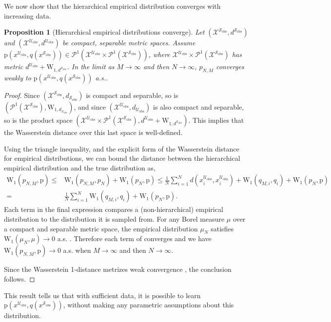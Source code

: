 \documentclass[12pt]{article}
\newtheorem{proposition}{Proposition}
\newcommand{\Sc}{\mathcal{S}}
\newcommand{\Uc}{\mathcal{U}}
\newcommand{\pr}{\mathrm{p}}
\newcommand{\obs}{\mathrm{obs}}
\newcommand{\Was}{\mathrm{W}}
\begin{document}
We now show that the hierarchical empirical distribution converges with increasing data.
\begin{proposition}[Hierarchical empirical distributions converge]
	Let $(\mathcal{X}^{\Sc_\obs}, d^{\Sc_\obs})$ and $(\mathcal{X}^{\Uc_\obs}, d^{\Uc_\obs})$ be compact, separable metric spaces.
	Assume $\pr(x^{\Uc_\obs}, q(x^{\Sc_\obs})) \in \mathcal{P}^1(\mathcal{X}^{\Uc_\obs} \times \mathcal{P}^1(\mathcal{X}^{\Sc_\obs}))$, where $\mathcal{X}^{\Uc_\obs} \times \mathcal{P}^1(\mathcal{X}^{\Sc_\obs})$ has metric $d^{\Uc_\obs} + \Was_{1,d^{\Sc_\obs}}$.
	In the limit as $M \to \infty $ and then $N \to \infty$,  $p_{N,M}$ converges weakly to $\pr(x^{\Uc_\obs}, q(x^{\Sc_\obs}))$ a.s..
\end{proposition}
\begin{proof}
	Since $(\mathcal{X}^{\Sc_\obs}, d_{\Sc_\obs})$ is compact and separable, so is $(\mathcal{P}^1(\mathcal{X}^{\Sc_\obs}), \Was_{1, d_{\Sc_\obs}})$, and since $(\mathcal{X}^{\Uc_\obs}, d_{\Uc_\obs})$ is also compact and separable, so is the product space $(\mathcal{X}^{\Uc_\obs} \times \mathcal{P}^1(\mathcal{X}^{\Sc_\obs}), d^{\Uc_\obs} + \Was_{1,d^{\Sc_\obs}})$.
	This implies that the Wasserstein distance over this last space is well-defined.
	
	Using the triangle inequality, and the explicit form of the Wasserstein distance for empirical distributions, we can bound the distance between the hierarchical empirical distribution and the true distribution as,
	\begin{equation} \label{eqn:wass_decomp}
	\begin{split}
		\Was_1(p_{N,M}, \pr) \le & \Was_1(p_{N,M}, p_N) + \Was_1(p_N, \pr) 
		\le \frac{1}{N} \sum_{i=1}^N d(x^{\Uc_\obs}_i, x^{\Uc_\obs}_i) + \Was_1(q_{M,i}, q_i) + \Was_1(p_N,\pr)\\ = & \frac{1}{N} \sum_{i=1}^N \Was_1(q_{M,i}, q_i) + \Was_1(p_N,\pr).
	\end{split}
	\end{equation}
	Each term in the final expression compares a (non-hierarchical) empirical distribution to the distribution it is sampled from.
	For any Borel measure $\mu$ over a compact and separable metric space, the empirical distribution $\mu_N$ satisfies $\Was_1(\mu_N,\mu) \to 0$ a.s. \citep[e.g.][]{Weed2019-mk}.
	Therefore each term of  converges and we have $\Was_1(p_{N,M}, \pr) \to 0$ a.s. when $M \to \infty$ and then $N \to\infty$.
	
	Since the Wasserstein 1-distance metrizes weak convergence \citep[e.g.][Theorem 6.9]{Villani2008-gw}, the conclusion follows.
\end{proof}
\noindent This result tells us that with sufficient data, it is possible to learn $\pr(x^{\Uc_\obs}, q(x^{\Sc_\obs}))$, without making any parametric assumptions about this distribution. 
\end{document}
